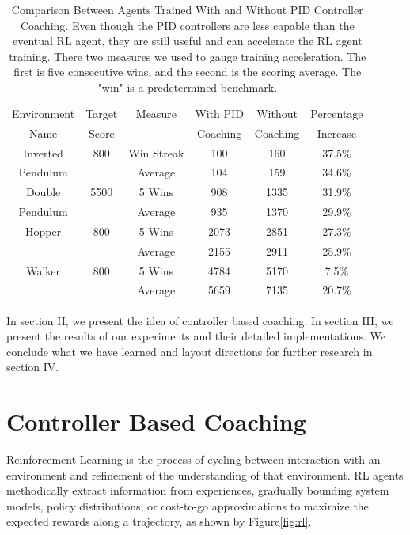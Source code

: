 \documentclass[journal]{IEEEtran}
\begin{document}
\begin{table}
\scriptsize
\caption{Comparison Between Agents Trained With and Without PID Controller Coaching. Even though the PID controllers are less capable than the eventual RL agent, they are still useful and can accelerate the RL agent training. There two measures we used to gauge training acceleration. The first is five consecutive wins, and the second is the scoring average. The "win" is a predetermined benchmark. }
\label{episode_compare}
\centering
\begin{tabular}{ cccccc }
\rowcolor{airforceblue}

Environment & Target & Measure  &  With PID  & Without  & Percentage\\
\rowcolor{airforceblue}

   Name     & Score  &              & Coaching  & Coaching  & Increase \\
\hline
Inverted & 800& Win Streak & 100 & 160&  37.5\% \\
Pendulum & &Average  & 104 &  159&  34.6\%\\
\rowcolor{beaublue}
Double & 5500& 5 Wins & 908 & 1335&  31.9\%\\
\rowcolor{beaublue}
Pendulum & &Average & 935 &  1370&  29.9\%\\
Hopper & 800& 5 Wins & 2073 & 2851&  27.3\%\\
       & &Average  & 2155 &  2911&  25.9\%\\
\rowcolor{beaublue}
Walker & 800& 5 Wins & 4784 & 5170&  7.5\%\\
\rowcolor{beaublue}
       & &Average  & 5659 &  7135&  20.7\%\\

\end{tabular}
\end{table}

In section II, we present the idea of controller based coaching. In section III, we present the results of our experiments and their detailed implementations. We conclude what we have learned and layout directions for further research in section IV.

\section{Controller Based Coaching}
Reinforcement Learning is the process of cycling between interaction with an environment and refinement of the understanding of that environment. RL agents methodically extract information from experiences, gradually bounding system models, policy distributions, or cost-to-go approximations to maximize the expected rewards along a trajectory, as shown by Figure\ref{fig:rl}. 
\end{document}
